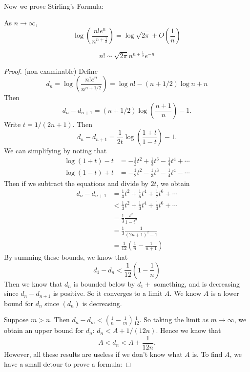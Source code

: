 \documentclass[a4paper]{article}
\begin{document}
Now we prove Stirling's Formula:
\begin{thm}
  As $n\to \infty$,
  \[
    \log\left(\frac{n! e^n}{n^{n + \frac{1}{2}}}\right) = \log \sqrt{2\pi} + O\left(\frac{1}{n}\right)
  \]
\end{thm}
\begin{cor}
  \[
    n!\sim \sqrt{2\pi}n^{n + \frac{1}{2}} e^{-n}
  \]
\end{cor}
\begin{proof}(non-examinable)
  Define
  \[
    d_n = \log \left(\frac{n!e^n}{n^{n + 1/2}}\right) = \log n! - (n + 1/2)\log n + n
  \]
  Then
  \[
    d_n - d_{n + 1} = (n + 1/2)\log\left(\frac{n + 1}{n}\right) - 1.
  \]
  Write $t = 1/(2n + 1)$. Then
  \[
    d_n - d_{n + 1} = \frac{1}{2t}\log\left(\frac{1 + t}{1 - t}\right) - 1.
  \]
  We can simplifying by noting that
  \begin{align*}
    \log (1 + t) - t &= -\frac{1}{2}t^2 + \frac{1}{3}t^3 - \frac{1}{4}t^4 + \cdots\\
    \log (1 - t) + t &= -\frac{1}{2}t^2 - \frac{1}{3}t^3 - \frac{1}{4}t^4 - \cdots
  \end{align*}
  Then if we subtract the equations and divide by $2t$, we obtain
  \begin{align*}
    d_n - d_{n + 1} &= \frac{1}{3}t^2 + \frac{1}{5}t^4 + \frac{1}{7}t^6 + \cdots\\
    &< \frac{1}{3}t^2 + \frac{1}{3}t^4 + \frac{1}{3}t^6 + \cdots\\
    &= \frac{1}{3}\frac{t^2}{1 - t^2}\\
    &= \frac{1}{3}\frac{1}{(2n + 1)^2 - 1}\\
    &= \frac{1}{12}\left(\frac{1}{n} - \frac{1}{n + 1}\right)
  \end{align*}
  By summing these bounds, we know that
  \[
    d_1 - d_n < \frac{1}{12}\left(1 - \frac{1}{n}\right)
  \]
  Then we know that $d_n$ is bounded below by $d_1 +$ something, and is decreasing since $d_n - d_{n + 1}$ is positive. So it converges to a limit $A$. We know $A$ is a lower bound for $d_n$ since $(d_n)$ is decreasing.

  Suppose $m > n$. Then $d_n - d_m < \left(\frac{1}{n} - \frac{1}{m}\right)\frac{1}{12}$. So taking the limit as $m\to \infty$, we obtain an upper bound for $d_n$: $d_n < A + 1/(12n)$. Hence we know that
  \[
    A < d_n < A + \frac{1}{12n}.
  \]
  However, all these results are useless if we don't know what $A$ is. To find $A$, we have a small detour to prove a formula:


\end{proof}
\end{document}
